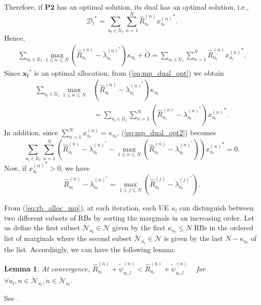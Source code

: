 \documentclass[twocolumn,10pt]{IEEEtran}
\newtheorem{appxlem}{Lemma}[section]
\begin{document}
\begin{IEEEproof}
Therefore, if $\mathbf{P2}$ has an optimal solution, its dual has an optimal solution, i.e., 
\begin{equation}
{\mathscr{D}_l}^* = \sum_{u_l \in \mathcal{U}_l} \sum_{n = 1}^{N} \widehat{R}_{u_l}^{(n)} {x_{u_l}^{(n)}}^*.
\end{equation}
Hence, 
\begin{align} \label{eq:mp_dual_opt}
\sum_{u_l \in \mathcal{U}_l} \underset{1 \leq n \leq N}{ \operatorname \max} \left(   \widehat{R}_{u_l}^{(n)} - \ddot{\lambda}_{u_l}^{{(n)}^*}  \right) \kappa_{u_l} + \widetilde{O} = \sum_{u_l \in \mathcal{U}_l} \sum_{n = 1}^{N} \widehat{R}_{u_l}^{(n)} {x_{u_l}^{(n)}}^*.
\end{align}
Since ${\boldsymbol{x_l}}^*$ is an optimal allocation, from (\ref{eq:mp_dual_opt}) we obtain
\begin{align} \label{eq:mp_dual_opt2}
\sum_{u_l \in \mathcal{U}_l} \underset{1 \leq n \leq N}{ \operatorname \max} & \left(   \widehat{R}_{u_l}^{(n)} - \ddot{\lambda}_{u_l}^{{(n)}^*}  \right) \kappa_{u_l} \nonumber \\ 
&= \sum_{u_l \in \mathcal{U}_l} \sum_{n = 1}^{N} \left( \widehat{R}_{u_l}^{(n)} - \ddot{\lambda}_{u_l}^{{(n)}^*} \right) {x_{u_l}^{(n)}}^*.
\end{align}
In addition, since $\displaystyle \sum_{n=1}^{N} x_{u_l}^{(n)} = \kappa_{u_l}$, (\ref{eq:mp_dual_opt2}) becomes
\begin{equation}
\sum_{u_l \in \mathcal{U}_l} \sum_{n = 1}^{N} \left(  \widehat{R}_{u_l}^{(n)}  - \ddot{\lambda}_{u_l}^{{(n)}^*}  - \underset{1 \leq n \leq N} { \operatorname \max} \left(   \widehat{R}_{u_l}^{(n)} - \ddot{\lambda}_{u_l}^{{(n)}^*}  \right) \right) {x_{u_l}^{(n)}}^* = 0.
\end{equation}
Now, if ${x_{u_l}^{(n)}}^*>0$, we have $$\widehat{R}_{u_l}^{(n)} - \ddot{\lambda}_{u_l}^{{(n)}^*} = 
\underset{1 \leq j \leq N}{ \operatorname \max} \left(   \widehat{R}_{u_l}^{(j)} - \ddot{\lambda}_{u_l}^{{(j)}^*}  \right). $$
\end{IEEEproof}

From (\ref{eq:rb_alloc_mp}), at each iteration, each UE $u_l$ can distinguish between two different subsets of RBs by sorting the marginals in an increasing order. Let us define  the first subset $\dot{\mathcal{N}}_{u_l} \in \mathcal{N}$ given by the first $\kappa_{u_l} \leq N$ RBs in the ordered list of marginals where the second subset $\ddot{\mathcal{N}}_{u_l} \in \mathcal{N}$ is given by the last $N - \kappa_{u_l}$ of the list. Accordingly, we can have the following lemma:
\begin{appxlem} \label{lemma:con-mp-2}
At convergence, $\widehat{R}_{u_l}^{(\dot{n})} + \tilde{\psi}_{u_l,l}^{(\dot{n})} < \widehat{R}_{u_l}^{(\ddot{n})} + \tilde{\psi}_{u_l,l}^{(\ddot{n})}$ ~ for $\forall u_l, \dot{n} \in \dot{\mathcal{N}}_{u_l}, \ddot{n} \in \ddot{\mathcal{N}}_{u_l}$.
\end{appxlem}
\begin{IEEEproof}
See \cite{min-sum-mp}. 
\end{IEEEproof}
\end{document}

